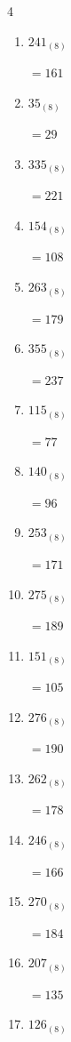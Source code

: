 \begin{multicols}{4}
\begin{enumerate}
  \item $241_{(8)}$

        $=161$

  \item $35_{(8)}$

        $=29$

  \item $335_{(8)}$

        $=221$

  \item $154_{(8)}$

        $=108$

  \item $263_{(8)}$

        $=179$

  \item $355_{(8)}$

        $=237$

  \item $115_{(8)}$

        $=77$

  \item $140_{(8)}$

        $=96$

  \item $253_{(8)}$

        $=171$

  \item $275_{(8)}$

        $=189$

\columnbreak %

  \item $151_{(8)}$

        $=105$

  \item $276_{(8)}$

        $=190$

  \item $262_{(8)}$

        $=178$

  \item $246_{(8)}$

        $=166$

  \item $270_{(8)}$

        $=184$

  \item $207_{(8)}$

        $=135$

  \item $126_{(8)}$


\end{enumerate}
\end{multicols}
